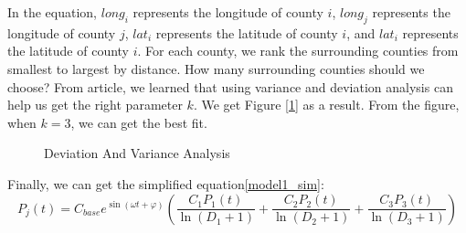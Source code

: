 \documentclass{mcmthesis}
\begin{document}
In the equation, $long_i$ represents the longitude of county $i$, $long_j$ represents the longitude of county $j$, $lat_i$ represents the latitude of county $i$, and $lat_i$ represents the latitude of county $i$. For each county, we rank the surrounding counties from smallest to largest by distance. How many surrounding counties should we choose? From article\cite{5}, we learned that using variance and deviation analysis can help us get the right parameter $k$. We get Figure [\ref{model1_deviation_variance}] as a result. From the figure, when $k = 3$, we can get the best fit.
\begin{figure}[ht]
	\centering
	\caption{Deviation And Variance Analysis}\label{model1_deviation_variance}	
\end{figure}

Finally, we can get the simplified equation\eqref{model1_sim}:
\begin{equation}
P_{j}(t) = C_{base} e^{\sin (\omega t+\varphi)} \left(\frac{C_1 P_1(t)}{\ln (D_1+1)}+\frac{C_2 P_2(t)}{\ln (D_2+1)}+\frac{C_3 P_3(t)}{\ln (D_3+1)}\right)
\label{model1_sim}
\end{equation}
\end{document}
